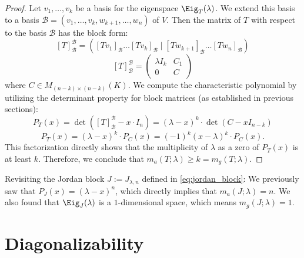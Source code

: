 \begin{proof}
  Let $v_1, \dots, v_k$ be a basis for the eigenspace $\Eig_T(\lambda)$. We extend this basis to a basis $\mathcal{B} = (v_1, \dots, v_k, w_{k+1}, \dots, w_n)$ of $V$.
  Then the matrix of $T$ with respect to the basis $\mathcal{B}$ has the block form:
  \[ [T]_{\mathcal{B}}^{\mathcal{B}} = \left( [Tv_1]_{\mathcal{B}} \dots [Tv_k]_{\mathcal{B}} \mid [Tw_{k+1}]_{\mathcal{B}} \dots [Tw_n]_{\mathcal{B}} \right) \]
  \begin{equation} \label{eq:block_matrix_T}
    [T]_{\mathcal{B}}^{\mathcal{B}} = \left(\begin{array}{c|c} \lambda I_k & C_1 \\ \hline 0 & C \end{array}\right)
  \end{equation}
  where $C \in M_{(n-k) \times (n-k)}(K)$.
  We compute the characteristic polynomial by utilizing the determinant property for block matrices (as established in previous sections):
  \[ P_T(x) = \det([T]_{\mathcal{B}}^{\mathcal{B}} - x \cdot I_n) = (\lambda - x)^k \cdot \det(C - x I_{n-k}) \]
  \[ P_T(x) = (\lambda - x)^k \cdot P_C(x) = (-1)^k(x - \lambda)^k \cdot P_C(x). \]
  This factorization directly shows that the multiplicity of $\lambda$ as a zero of $P_T(x)$ is at least $k$.
  Therefore, we conclude that $m_a(T;\lambda) \ge k = m_g(T;\lambda)$.
\end{proof}

\begin{example}\label{ex:jordan_block_geom_alg}
  Revisiting the Jordan block $J := J_{\lambda, n}$ defined in \eqref{eq:jordan_block}:
  We previously saw that $P_J(x) = (\lambda - x)^n$, which directly implies that $m_a(J;\lambda) = n$.
  We also found that $\Eig_J(\lambda)$ is a $1$-dimensional space, which means $m_g(J;\lambda) = 1$.
\end{example}


\section{Diagonalizability}

